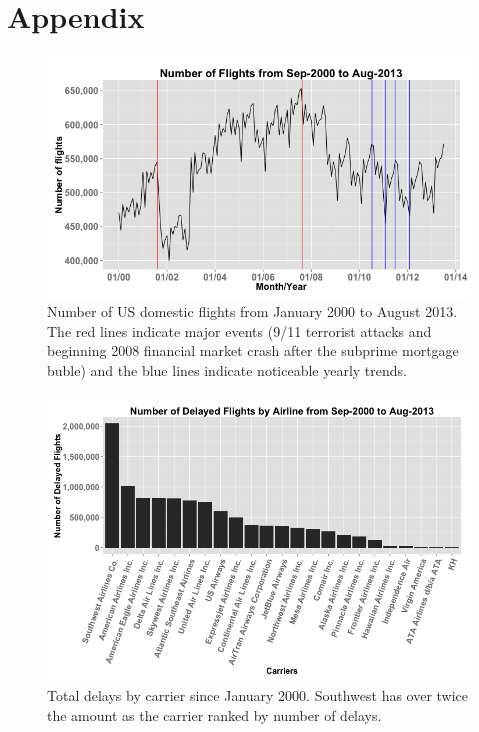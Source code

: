 \documentclass[11pt,twoside,titlepage]{article}
\begin{document}
\section*{Appendix}
\vspace*{4cm}
\begin{figure}[h!]
        \centering
                \includegraphics[width=15cm]{Number_of_Flights1.png}
        \caption{Number of US domestic flights from January 2000 to August 2013. The red lines indicate major events (9/11 terrorist attacks and beginning 2008 financial market crash after the subprime mortgage buble) and the blue lines indicate noticeable yearly trends.}\label{fig:Number of Flights}
\end{figure}


\begin{figure}[h!]
        \centering
                \includegraphics[width=16cm]{Delayed_by_Airline1.png}
        \caption{Total delays by carrier since January 2000. Southwest has over twice the amount as the carrier ranked by number of delays.}\label{fig:Delays by Carrier}
\end{figure}
\end{document}
